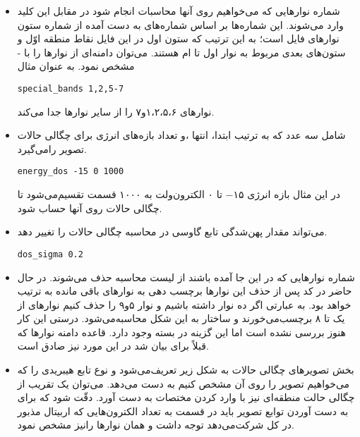 \begin{itemize}
 \item{}
شماره نوارهایی که می‌خواهیم روی آنها محاسبات  انجام شود در مقابل این کلید وارد می‌شوند. این شماره‌ها بر اساس شماره‌های به دست آمده از 
شماره ستون نوارهای فایل است؛ به این ترتیب که ستون اول در این فایل نقاط منطقه اوّل و ستون‌های بعدی مربوط به نوار اول تا ام هستند. می‌توان 
دامنه‌ای از نوارها را با - مشخص نمود. به عنوان مثال 
 \begin{latin}
\begin{lstlisting}[style=Mybash]
special_bands 1,2,5-7
\end{lstlisting}
\end{latin}
نوارهای ۱،۲،۵،۶و۷ را از سایر نوارها جدا می‌کند.
 
 \item{}
شامل سه عدد که به ترتیب ابتدا، انتها ،و تعداد بازه‌های انرژی برای چگالی حالات تصویر را‌می‌گیرد.
\begin{latin}
\begin{lstlisting}[style=Mybash]
energy_dos -15 0 1000
\end{lstlisting}
\end{latin}
در این مثال بازه انرژی $−۱۵$ تا $۰$ الکترون‌ولت به $۱۰۰۰$ قسمت تقسیم‌می‌شود تا چگالی حالات روی آنها حساب شود.
\item{}
می‌تواند مقدار پهن‌شدگی تابع گاوسی در محاسبه چگالی حالات را تغییر دهد.
\begin{latin}
\begin{lstlisting}[style=Mybash]
dos_sigma 0.2
\end{lstlisting}
\end{latin}
\item{}
شماره نوارهایی که در این جا آمده باشند از لیست محاسبه حذف می‌شوند. در حال حاضر در کد پس از حذف این نوارها برچسب دهی به نوارهای باقی مانده به ترتیب خواهد بود. به 
عبارتی اگر ده نوار داشته باشیم و نوار ۵و۹ را حذف کنیم نوارهای از یک تا ۸ برچسب‌می‌خورند و ساختار به این شکل محاسبه‌می‌شود. درستی این کار هنوز بررسی نشده است اما 
این گزینه در بسته  وجود دارد. قاعده دامنه نوارها که قبلاً برای  بیان شد در این مورد نیز صادق است.
\item{}
بخش تصویرهای چگالی حالات به شکل زیر تعریف‌می‌شود و نوع تابع هیبریدی را که می‌خواهیم تصویر را روی آن مشخص کنیم به دست می‌دهد. می‌توان یک تقریب از چگالی حالت 
منطقه‌ای نیز با وارد کردن مختصات به دست آورد. دقّت شود که برای به دست آوردن توابع تصویر باید در قسمت  به تعداد الکترون‌هایی که اربیتال 
مذبور در کل شرکت‌می‌دهد توجه داشت و همان نوارها رانیز مشخص نمود.


\end{itemize}
